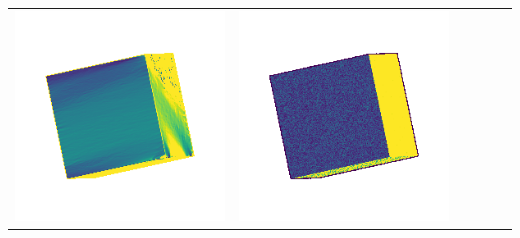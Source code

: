 \begin{center}
\begin{tabularx}{\linewidth}{@{}Y@{}Y@{}Y@{}Y@{}Y@{}Y@{}}
\includegraphics[width=\linewidth]{semisynthetic/20150514_0_yu_err.png} &
\includegraphics[width=\linewidth]{semisynthetic/20150514_0_dpsn_err.png} &

\end{tabularx}
\end{center}
